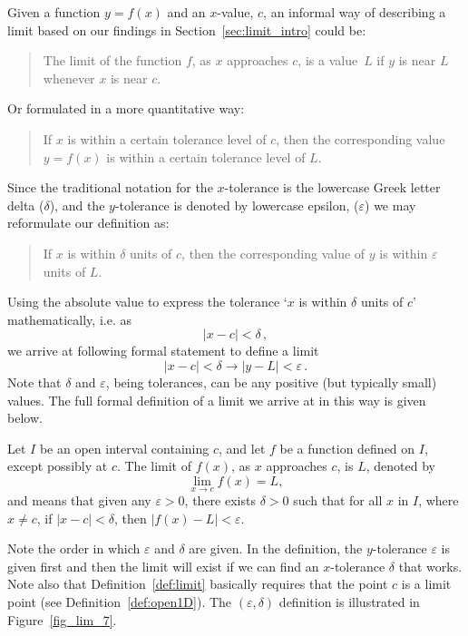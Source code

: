 \fi

\ifvc
Given a function $y=f(x)$ and an $x$-value, $c$, an informal way of describing a limit based on our findings in Section~\ref{sec:limit_intro} could be: 
\begin{quote}
The limit of the function $f$, as $x$ approaches $c$, is a value~$L$ if $y$ is near $L$  whenever $x$ is near $c$.
\end{quote}
Or formulated in a more quantitative way:

\begin{quote}
If $x$ is within a certain tolerance level of $c$, then the corresponding value $y=f(x)$ is within a certain tolerance level of $L$.
\end{quote}

Since the traditional notation for the $x$-tolerance is the lowercase Greek letter delta ($\delta$), and the $y$-tolerance is denoted by lowercase epsilon, ($\varepsilon$) we may reformulate our definition as:

\begin{quote}
If $x$ is within $\delta$ units of $c$, then the corresponding value of $y$ is within $\varepsilon$ units of $L$.
\end{quote}

Using the absolute value to express the tolerance `$x$ is within $\delta$ units of $c$' mathematically, i.e. as 
$$|x-c| < \delta\,, $$
we arrive at following formal statement to define a limit
$$
|x - c| < \delta \longrightarrow  |y - L| < \varepsilon\,.
$$
Note that $\delta$ and $\varepsilon$, being tolerances, can be any positive (but typically small) values. The full formal definition of a limit we arrive at in this way is given below. 

\fi


\begin{definition}\label{def:limit}
Let $I$ be an open interval containing $c$, and let $f$ be a function defined on $I$, except possibly at $c$. The limit of $f(x)$, as $x$ approaches $c$, is $L$, denoted by  
$$\displaystyle \lim_{x\rightarrow c} f(x) = L,$$
and means that given any $\varepsilon > 0$, there exists $\delta > 0$ such that for all $x$ in $I$, where $x\neq c$,  
if  $|x - c| < \delta$, then $|f(x) - L| < \varepsilon$.
\end{definition}  



Note the order in which $\varepsilon$ and $\delta$ are given.  In the definition, the $y$-tolerance $\varepsilon$ is given first and then the limit will exist  if we can find an $x$-tolerance $\delta$ that works. \ifanalysis Note also that Definition~\ref{def:limit} basically requires that the point $c$ is a limit point (see Definition~\ref{def:open1D}). \fi \ifcourse The $(\varepsilon,\delta)$ definition is illustrated in Figure~\ref{fig_lim_7}.\fi


